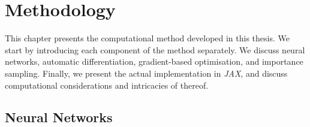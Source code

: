 \ifpdf
\graphicspath{{Chapter4/Figs/Raster/}{Chapter4/Figs/PDF/}{Chapter4/Figs/}}
\else
\graphicspath{{Chapter4/Figs/Vector/}{Chapter4/Figs/}}
\fi


\chapter{Methodology}
\label{chapter4}
This chapter presents the computational method developed in this thesis. We start by introducing each component of the method separately. We discuss neural networks, automatic differentiation, gradient-based optimisation, and importance sampling. Finally, we present the actual implementation in \emph{JAX}, and discuss computational considerations and intricacies of thereof.

\section{Neural Networks} %
